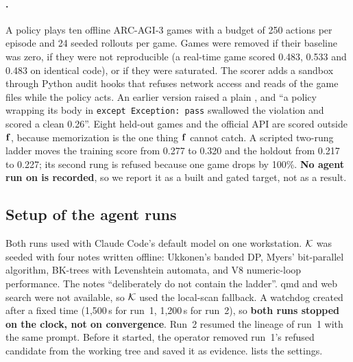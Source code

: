 \paragraph{.} A policy plays ten offline ARC-AGI-3 games with a budget of 250 actions
per episode and 24 seeded rollouts per game. Games were removed if their baseline was zero, if they
were not reproducible (a real-time game scored 0.483, 0.533 and 0.483 on identical code), or if they
were saturated. The scorer adds a sandbox through Python audit hooks that refuses network access and
reads of the game files while the policy acts. An earlier version raised a plain ,
and ``a policy wrapping its body in \texttt{except Exception: pass} swallowed the violation and
scored a clean 0.26''. Eight held-out games and the official API are scored outside $\mathbf{f}$, because
memorization is the one thing $\mathbf{f}$ cannot catch. A scripted two-rung ladder moves the training score
from 0.277 to 0.320 and the holdout from 0.217 to 0.227; its second rung is refused because one game
drops by 100\%. \textbf{No agent run on  is recorded}, so we report it as a built and
gated target, not as a result.

\subsection{Setup of the agent runs}

Both runs used  with Claude Code's default model on one workstation. $\mathcal{K}$
was seeded with four notes written offline: Ukkonen's banded DP, Myers' bit-parallel algorithm,
BK-trees with Levenshtein automata, and V8 numeric-loop performance. The notes ``deliberately do not
contain the ladder''. qmd and web search were not available, so $\mathcal{K}$ used the local-scan fallback. A
watchdog created  after a fixed time (1{,}500\,s for run~1, 1{,}200\,s for run~2), so
\textbf{both runs stopped on the clock, not on convergence}. Run~2 resumed the lineage of run~1 with
the same prompt. Before it started, the operator removed run~1's refused candidate from the working
tree and saved it as evidence.  lists the settings.

